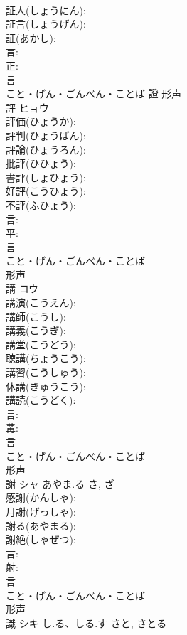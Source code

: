 \documentclass[8pt]{extreport}
\begin{document}
\begin{CJK}{UTF8}{min}
\\	証人(しょうにん): 
\\	証言(しょうげん): 
\\	証(あかし): 
\\	言: 
\\	正: 
\\	言	
\\	こと・げん・ごんべん・ことば	證	形声 
\\	評	ヒョウ			
\\	評価(ひょうか): 
\\	評判(ひょうばん): 
\\	評論(ひょうろん): 
\\	批評(ひひょう): 
\\	書評(しょひょう): 
\\	好評(こうひょう): 
\\	不評(ふひょう): 
\\	言: 
\\	平: 
\\	言	
\\	こと・げん・ごんべん・ことば	
\\	形声 
\\	講	コウ			
\\	講演(こうえん): 
\\	講師(こうし): 
\\	講義(こうぎ): 
\\	講堂(こうどう): 
\\	聴講(ちょうこう): 
\\	講習(こうしゅう): 
\\	休講(きゅうこう): 
\\	講読(こうどく): 
\\	言: 
\\	冓: 
\\	言	
\\	こと・げん・ごんべん・ことば	
\\	形声 
\\	謝	シャ	あやま.る	さ, ざ	
\\	感謝(かんしゃ): 
\\	月謝(げっしゃ): 
\\	謝る(あやまる): 
\\	謝絶(しゃぜつ): 
\\	言: 
\\	射: 
\\	言	
\\	こと・げん・ごんべん・ことば	
\\	形声 
\\	識	シキ	し.る、しる.す	さと, さとる	

\end{CJK}
\end{document}
